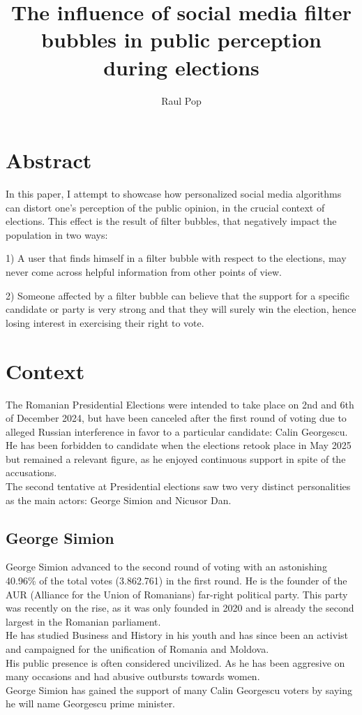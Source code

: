 \documentclass{article}
\title{The influence of social media filter bubbles in public perception during elections}
\author{Raul Pop}
\begin{document}
\maketitle

\section{Abstract}

In this paper, I attempt to showcase how personalized social media algorithms can distort one's perception of the public opinion, in the crucial context of elections. This effect is the result of filter bubbles, that negatively impact the population in two ways:

1) A user that finds himself in a filter bubble with respect to the elections, may never come across helpful information from other points of view.

2) Someone affected by a filter bubble can believe that the support for a specific candidate or party is very strong and that they will surely win the election, hence losing interest in exercising their right to vote.

\section{Context}

The Romanian Presidential Elections were intended to take place on 2nd and 6th of December 2024, but have been canceled after the first round of voting due to alleged Russian interference in favor to a particular candidate: Calin Georgescu. He has been forbidden to candidate when the elections retook place in May 2025 but remained a relevant figure, as he enjoyed continuous support in spite of the accusations.
\\ The second tentative at Presidential elections saw two very distinct personalities as the main actors: George Simion and Nicusor Dan.

\subsection{George Simion}
George Simion advanced to the second round of voting with an astonishing 40.96\% of the total votes (3.862.761) in the first round. He is the founder of the AUR (Alliance for the Union of Romanians) far-right political party. This party was recently on the rise, as it was only founded in 2020 and is already the second largest in the Romanian parliament.
\\ He has studied Business and History in his youth and has since been an activist and campaigned for the unification of Romania and Moldova.
\\ His public presence is often considered uncivilized. As he has been aggresive on many occasions and had abusive outbursts towards women.
\\ George Simion has gained the support of many Calin Georgescu voters by saying he will name Georgescu prime minister.
\end{document}
